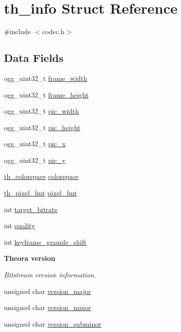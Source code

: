 \hypertarget{structth__info}{}\section{th\+\_\+info Struct Reference}
\label{structth__info}


{\ttfamily \#include $<$codec.\+h$>$}

\subsection*{Data Fields}
\begin{DoxyCompactItemize}
\item 
ogg\+\_\+uint32\+\_\+t \hyperlink{structth__info_a6b8087a4d831da53011a43b8d74087a0}{frame\+\_\+width}
\item 
ogg\+\_\+uint32\+\_\+t \hyperlink{structth__info_a6b1adc3a16a8336a72692b0a5937214c}{frame\+\_\+height}
\item 
ogg\+\_\+uint32\+\_\+t \hyperlink{structth__info_a5048edf77b141dd3e9a92ca85e317345}{pic\+\_\+width}
\item 
ogg\+\_\+uint32\+\_\+t \hyperlink{structth__info_a775178474283c5990ba73f9ba7f6b88b}{pic\+\_\+height}
\item 
ogg\+\_\+uint32\+\_\+t \hyperlink{structth__info_a5b3f834bcf141564e7bb14f49101870f}{pic\+\_\+x}
\item 
ogg\+\_\+uint32\+\_\+t \hyperlink{structth__info_a8aacc575cab2dfe3735001c2ad32aa14}{pic\+\_\+y}
\item 
\hyperlink{theora_2codec_8h_a4ce7a695ce353b1582d29b6c1ddf31a0}{th\+\_\+colorspace} \hyperlink{structth__info_a8c7828cd0e023e9d21108160d53659a6}{colorspace}
\item 
\hyperlink{theora_2codec_8h_a5c9e7f2f0c7ed209c9ca3ed0abd328bc}{th\+\_\+pixel\+\_\+fmt} \hyperlink{structth__info_a2301388ef3755c41ab12fd144c1fc54e}{pixel\+\_\+fmt}
\item 
int \hyperlink{structth__info_a1d9c8d768a4ae623269f5bd8f6f7a015}{target\+\_\+bitrate}
\item 
int \hyperlink{structth__info_aa4cdcf96cb46b256821993e9a830ee02}{quality}
\item 
int \hyperlink{structth__info_a693ca4ab11fbc0c3f32594b4bb8766ed}{keyframe\+\_\+granule\+\_\+shift}
\end{DoxyCompactItemize}
\begin{Indent}\textbf{ Theora version}\par
{\em Bitstream version information. }\begin{DoxyCompactItemize}
\item 
unsigned char \hyperlink{structth__info_a60b3e2cac006fee0e105a918d6a5a9f9}{version\+\_\+major}
\item 
unsigned char \hyperlink{structth__info_abb1d4887a8079c6c5aaa6d7229f243d7}{version\+\_\+minor}
\item 
unsigned char \hyperlink{structth__info_abfacc79b7cabae12b6ac2484f76602d3}{version\+\_\+subminor}
\end{DoxyCompactItemize}
\end{Indent}
